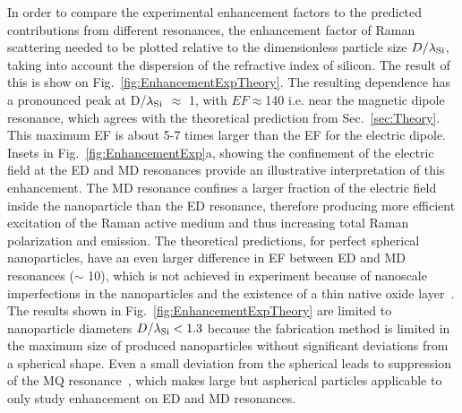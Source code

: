            In order to compare the experimental enhancement factors to the predicted contributions from different resonances, the
        enhancement factor of Raman scattering needed to be plotted relative to the dimensionless particle size $D/\lambda_{\rm Si}$,
        taking into account the dispersion of the refractive index of silicon. The result of this is show on Fig.~\ref{fig:EnhancementExpTheory}.
        The resulting dependence has a pronounced peak at D/$\lambda_{\rm Si}$ $\approx$ 1, with $EF\approx$140 i.e. near the
        magnetic dipole resonance, which agrees with the theoretical prediction from Sec.~\ref{sec:Theory}. This maximum EF is about 5-7 times larger than the EF for the
        electric dipole. Insets in Fig.~\ref{fig:EnhancementExp}a, showing the confinement of the electric field at the ED and MD resonances
        provide an illustrative interpretation of this enhancement. The MD resonance confines a larger fraction of the electric field inside the
        nanoparticle than the ED resonance, therefore producing more efficient excitation of the Raman active medium and thus increasing total
        Raman polarization and emission. The theoretical predictions, for perfect spherical nanoparticles, have an even larger difference in EF
        between ED and MD resonances ($\sim$ 10), which is not achieved in experiment because of nanoscale imperfections in the nanoparticles
        and the existence of a thin native oxide layer~\cite{fu2012directional, zywietz2015electromagnetic}.
        The results shown in Fig.~\ref{fig:EnhancementExpTheory} are limited to nanoparticle diameters $D/\lambda_{\rm Si}<1.3$
        because the fabrication method is limited in the maximum size of produced nanoparticles without significant deviations from a spherical shape.
        Even a small deviation from the spherical leads to suppression of the MQ resonance~\cite{fu2012directional}, which makes large but aspherical
        particles applicable to only study enhancement on ED and MD resonances.
